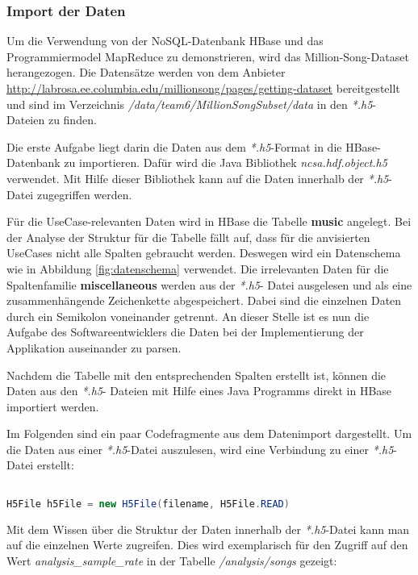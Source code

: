 \subsubsection{Import der Daten}
Um die Verwendung von der NoSQL-Datenbank HBase und das Programmiermodel MapReduce zu demonstrieren, wird das Million-Song-Dataset herangezogen. Die Datensätze werden von dem Anbieter \url{http://labrosa.ee.columbia.edu/millionsong/pages/getting-dataset} bereitgestellt und  sind im Verzeichnis \textit{/data/team6/MillionSongSubset/data} in den \textit{*.h5}-Dateien zu finden. 

Die erste Aufgabe liegt darin die Daten aus dem \textit{*.h5}-Format in die HBase-Datenbank zu importieren.
Dafür wird die Java Bibliothek \textit{ncsa.hdf.object.h5} verwendet. Mit Hilfe dieser Bibliothek kann auf die Daten innerhalb der \textit{*.h5}-Datei zugegriffen werden.

Für die UseCase-relevanten Daten wird in HBase die Tabelle \textbf{music} angelegt. Bei der Analyse der Struktur für die Tabelle fällt auf, dass für die anvisierten UseCases nicht alle Spalten gebraucht werden. Deswegen wird ein Datenschema wie in Abbildung \ref{fig:datenschema} verwendet. Die irrelevanten Daten für die Spaltenfamilie \textbf{miscellaneous} werden aus der \textit{*.h5}- Datei ausgelesen und als eine zusammenhängende Zeichenkette abgespeichert. Dabei sind die einzelnen Daten durch ein Semikolon voneinander getrennt. An dieser Stelle ist es nun die Aufgabe des Softwareentwicklers die Daten bei der Implementierung der Applikation auseinander zu parsen.

Nachdem die Tabelle mit den entsprechenden Spalten erstellt ist, können die Daten aus den \textit{*.h5}- Dateien mit Hilfe eines Java Programms direkt in HBase importiert werden.

Im Folgenden sind ein paar Codefragmente aus dem Datenimport dargestellt.
Um die Daten aus einer \textit{*.h5}-Datei auszulesen, wird eine Verbindung zu einer \textit{*.h5}-Datei erstellt:



\begin{lstlisting}[language=Java]%[caption={fgdfgfd}, label=mapreduce:dgdgs]

H5File h5File = new H5File(filename, H5File.READ)
\end{lstlisting}
Mit dem Wissen über die Struktur der Daten innerhalb der \textit{*.h5}-Datei kann man auf die einzelnen Werte zugreifen. Dies wird exemplarisch für den Zugriff auf den Wert \textit{analysis\_sample\_rate} in der Tabelle \textit{/analysis/songs} gezeigt:\\

